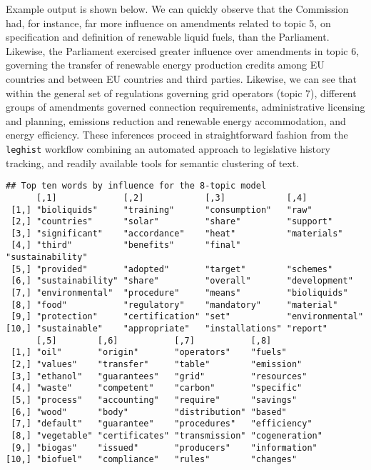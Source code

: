 \documentclass[11pt]{article}
\begin{document}
Example output is shown below. We can quickly observe that the
Commission had, for instance, far more influence on amendments related
to topic 5, on specification and definition of renewable liquid fuels,
than the Parliament. Likewise, the Parliament exercised greater
influence over amendments in topic 6, governing the transfer of
renewable energy production credits among EU countries and between EU
countries and third parties. Likewise, we can see that within the
general set of regulations governing grid operators (topic 7),
different groups of amendments governed connection requirements,
administrative licensing and planning, emissions reduction and
renewable energy accommodation, and energy efficiency. These
inferences proceed in straightforward fashion from the
\texttt{leghist} workflow combining
an automated approach to legislative history tracking, and readily
available tools for semantic clustering of text. 

\begin{verbatim}
## Top ten words by influence for the 8-topic model
      [,1]             [,2]            [,3]            [,4]            
 [1,] "bioliquids"     "training"      "consumption"   "raw"           
 [2,] "countries"      "solar"         "share"         "support"       
 [3,] "significant"    "accordance"    "heat"          "materials"     
 [4,] "third"          "benefits"      "final"         "sustainability"
 [5,] "provided"       "adopted"       "target"        "schemes"       
 [6,] "sustainability" "share"         "overall"       "development"   
 [7,] "environmental"  "procedure"     "means"         "bioliquids"    
 [8,] "food"           "regulatory"    "mandatory"     "material"      
 [9,] "protection"     "certification" "set"           "environmental" 
[10,] "sustainable"    "appropriate"   "installations" "report"        
      [,5]        [,6]           [,7]           [,8]          
 [1,] "oil"       "origin"       "operators"    "fuels"       
 [2,] "values"    "transfer"     "table"        "emission"    
 [3,] "ethanol"   "guarantees"   "grid"         "resources"   
 [4,] "waste"     "competent"    "carbon"       "specific"    
 [5,] "process"   "accounting"   "require"      "savings"     
 [6,] "wood"      "body"         "distribution" "based"       
 [7,] "default"   "guarantee"    "procedures"   "efficiency"  
 [8,] "vegetable" "certificates" "transmission" "cogeneration"
 [9,] "biogas"    "issued"       "producers"    "information" 
[10,] "biofuel"   "compliance"   "rules"        "changes"
\end{verbatim}
\end{document}
